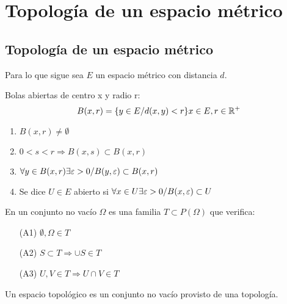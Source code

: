 \chapter{Topología de un espacio métrico}
\section{Topología de un espacio métrico}
    Para lo que sigue sea $E$ un espacio métrico con distancia $d$.\\
    \begin{definicion}
        Bolas abiertas de centro x y radio r:
        $$B(x,r) = \{ y \in E / d(x,y)< r\} \\ x \in E, \\ r \in \mathbb R^+ $$
        \begin{enumerate}
            \item $B(x,r) \neq \emptyset$
            \item $0 < s < r \Longrightarrow B(x,s) \subset B(x,r)$
            \item $\forall y \in B(x,r) \\ \exists \varepsilon >0 \\ / \\ B(y,\varepsilon) \subset B(x,r)$
            \item Se dice $U\in E$ abierto si $\forall x \in U \\\exists \varepsilon > 0 \\/ \\B(x, \varepsilon ) \subset U$
        \end{enumerate}
    \end{definicion}
    
    \begin{definicion}[Topología]
        En un conjunto no vacío $\Omega$ es una familia $T \subset P(\Omega)$ que verifica:
        \begin{itemize}
            \item[(A1)] $\emptyset, \Omega \in T$
            \item[(A2)] $S \subset T \Longrightarrow \cup S \in T$
            \item[(A3)] $U, V \in T \Longrightarrow U \cap V \in T$
        \end{itemize}
    Un espacio topológico es un conjunto no vacío provisto de una topología. 
    \end{definicion}

